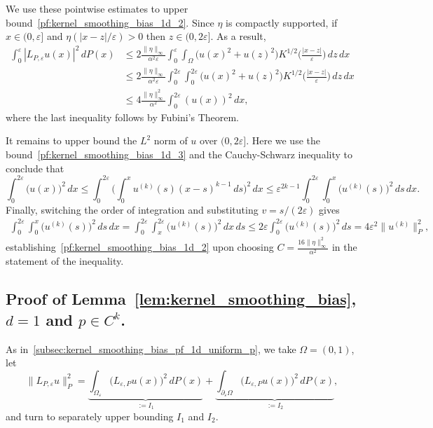\documentclass{article}
\newcommand{\1}{\mathbf{1}}
\newcommand{\Leb}{L}
\theoremstyle{definition}
\theoremstyle{remark}
\begin{document}
We use these pointwise estimates to upper bound~\eqref{pf:kernel_smoothing_bias_1d_2}. Since $\eta$ is compactly supported, if $x \in (0,\varepsilon]$ and $\eta(|x - z|/\varepsilon) > 0$ then $z \in (0,2\varepsilon]$. As a result,
\begin{align*}
\int_{0}^{\varepsilon} |L_{P,\varepsilon}u(x)|^2 \,dP(x) & \leq 2\frac{\|\eta\|_{\infty}}{\alpha^2\varepsilon} \int_{0}^{\varepsilon}  \int_{\Omega} \bigl(u(x)^2 + u(z)^2\bigr) K^{1/2}\biggl(\frac{|x - z|}{\varepsilon}\biggr) \,dz \,dx \\
& \leq 2\frac{\|\eta\|_{\infty}}{\alpha^2\varepsilon} \int_{0}^{2\varepsilon}  \int_{0}^{2\varepsilon} \bigl(u(x)^2 + u(z)^2\bigr) K^{1/2}\biggl(\frac{|x - z|}{\varepsilon}\biggr) \,dz \,dx \\
& \leq 4\frac{\|\eta\|_{\infty}^2}{\alpha^2} \int_{0}^{2\varepsilon} (u(x))^2 \,dx,
\end{align*}
where the last inequality follows by Fubini's Theorem.

It remains to upper bound the $\Leb^2$ norm of $u$ over $(0,2\varepsilon]$. Here we use the bound~\eqref{pf:kernel_smoothing_bias_1d_3} and the Cauchy-Schwarz inequality to conclude that 
\begin{equation*}
\int_{0}^{2\varepsilon} \bigl(u(x)\bigr)^2 \,dx \leq \int_{0}^{2\varepsilon} \biggl(\int_{0}^{x} u^{(k)}(s)(x - s)^{k - 1} \,ds\biggr)^2 \,dx \leq \varepsilon^{2k - 1} \int_{0}^{2\varepsilon} \int_{0}^{x} \bigl(u^{(k)}(s)\bigr)^2 \,ds \,dx. 
\end{equation*}
Finally, switching the order of integration and substituting $v = s/(2\varepsilon)$ gives
\begin{align*}
\int_{0}^{2\varepsilon} \int_{0}^{x} \bigl(u^{(k)}(s)\bigr)^2 \,ds \,dx = \int_{0}^{2\varepsilon} \int_{x}^{2\varepsilon} \bigl(u^{(k)}(s)\bigr)^2 \,dx \,ds \leq 2\varepsilon \int_{0}^{2\varepsilon} \bigl(u^{(k)}(s)\bigr)^2 \,ds = 4\varepsilon^2 \|u^{(k)}\|_P^2,
\end{align*}
establishing~\eqref{pf:kernel_smoothing_bias_1d_2} upon choosing $C = \frac{16\|\eta\|_{\infty}^2}{\alpha^2}$ in the statement of the inequality.

\subsection{Proof of Lemma~\ref{lem:kernel_smoothing_bias}, $d = 1$ and $p \in C^k$.}
\label{subsec:kernel_smoothing_bias_pf_1d_smooth_p}
As in~\ref{subsec:kernel_smoothing_bias_pf_1d_uniform_p}, we take $\Omega = (0,1)$, let
\begin{equation*}
\|L_{P,\varepsilon}u\|_{P}^2 = \underbrace{\int_{\Omega_{\varepsilon}} \bigl(L_{\varepsilon,P}u(x)\bigr)^2 \,dP(x)}_{:=I_1} + \underbrace{\int_{\partial_{\varepsilon}\Omega} \bigl(L_{\varepsilon,P}u(x)\bigr)^2 \,dP(x)}_{:=I_2},
\end{equation*}
and turn to separately upper bounding $I_1$ and $I_2$.
\end{document}
